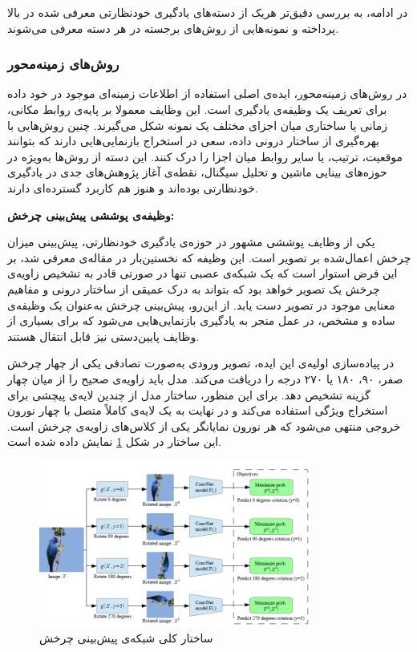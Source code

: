 در ادامه، به بررسی دقیق‌تر هریک از دسته‌های یادگیری خودنظارتی معرفی شده در بالا پرداخته و نمونه‌هایی از روش‌های برجسته در هر دسته معرفی می‌شوند.

\subsubsection{روش‌های زمینه‌محور}

در روش‌های زمینه‌محور، ایده‌ی اصلی استفاده از اطلاعات زمینه‌ای موجود در خود داده برای تعریف یک وظیفه‌ی یادگیری است. این وظایف معمولا بر پایه‌ی روابط مکانی، زمانی یا ساختاری میان اجزای مختلف یک نمونه شکل می‌گیرند. چنین روش‌هایی با بهره‌گیری از ساختار درونی داده، سعی در استخراج بازنمایی‌هایی دارند که بتوانند موقعیت، ترتیب، یا سایر روابط میان اجزا را درک کنند. این دسته از روش‌ها به‌ویژه در حوزه‌های بینایی ماشین و تحلیل سیگنال، نقطه‌ی آغاز پژوهش‌های جدی در یادگیری خودنظارتی بوده‌اند و هنوز هم کاربرد گسترده‌ای دارند.\newline

\noindent\textbf{وظیفه‌ی پوششی پیش‌بینی چرخش:}

یکی از وظایف پوششی مشهور در حوزه‌ی یادگیری خودنظارتی، پیش‌بینی میزان چرخش اعمال‌شده بر تصویر است. این وظیفه که نخستین‌بار در مقاله‌ی  \cite{gidaris2018unsupervised} معرفی شد، بر این فرض استوار است که یک شبکه‌ی عصبی تنها در صورتی قادر به تشخیص زاویه‌ی چرخش یک تصویر خواهد بود که بتواند به درک عمیقی از ساختار درونی و مفاهیم معنایی موجود در تصویر دست یابد. از این‌رو، پیش‌بینی چرخش به‌عنوان یک وظیفه‌ی ساده و مشخص، در عمل منجر به یادگیری بازنمایی‌هایی می‌شود که برای بسیاری از وظایف پایین‌دستی نیز قابل انتقال هستند.

در پیاده‌سازی اولیه‌ی این ایده، تصویر ورودی به‌صورت تصادفی یکی از چهار چرخش صفر، ۹۰، ۱۸۰ یا ۲۷۰ درجه را دریافت می‌کند. مدل باید زاویه‌ی صحیح را از میان چهار گزینه تشخیص دهد. برای این منظور، ساختار مدل از چندین لایه‌ی پیچشی  برای استخراج ویژگی استفاده می‌کند و در نهایت به یک لایه‌ی کاملاً متصل با چهار نورون خروجی منتهی می‌شود که هر نورون نمایانگر یکی از کلاس‌های زاویه‌ی چرخش است. این ساختار در شکل \ref{fig:rotnet} نمایش داده شده است.

\begin{figure}[htbp]
\centering
\includegraphics[width=0.8\textwidth]{Images/Chapter2/rotnet.png}
\caption{ساختار کلی شبکه‌ی پیش‌بینی چرخش}
\label{fig:rotnet}
\end{figure}

